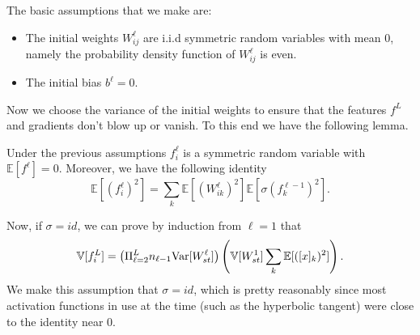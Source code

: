 The basic assumptions that we make are:
\begin{itemize}
	\item The initial weights $W^\ell_{ij}$ are i.i.d symmetric random variables with mean $0$, namely the 
	probability density function of $W^\ell_{ij}$ is even.
	\item The initial bias $b^\ell = 0$.
\end{itemize}


Now we choose the variance of the initial weights to ensure that the features $f^L$ and gradients don't blow up or vanish. To this end we have the following lemma.

\begin{lemma}\label{lemm:init}
	Under the previous assumptions $f^\ell_i$  is a symmetric random variable with $\mathbb{E}[f^\ell] = 0$.
	Moreover, we have the following identity
	\begin{equation}\label{eq:FWini}
	\mathbb{E}[(f^{\ell}_i)^2] = \sum_{k}\mathbb{E}[(W^\ell_{ik})^2]\mathbb{E}[\sigma(f^{\ell-1}_k)^2].
	\end{equation}
\end{lemma}



Now, if $\sigma  = id$, we can prove by induction from $\ell = 1$ that
	\begin{equation}\label{key}
	\mathbb V [f^{L}_i] =  \left(\Pi_{\ell=2}^{L} n_{\ell-1} {\rm Var} [W^\ell_{st}] \right) \left(\mathbb{V}[W^1_{st}]\sum_{k}\mathbb{E}[( [x]_k)^2] \right).
	\end{equation}
We make this assumption that $\sigma  = id$, which is pretty reasonably since most activation functions in use at the time (such as the hyperbolic tangent) were close to the identity near $0$.

